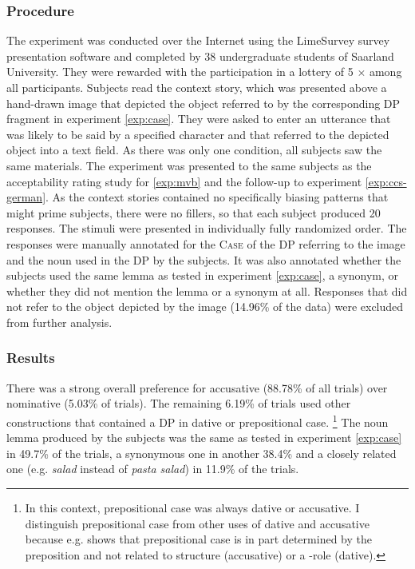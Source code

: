 \subsubsection{Procedure}
The experiment was conducted over the Internet using the LimeSurvey survey presentation software and completed by 38 undergraduate students of Saarland University. They were rewarded with the participation in a lottery of 5 $\times$  among all participants. Subjects read the context story, which was presented above a hand-drawn image that depicted the object referred to by the corresponding DP fragment in experiment \ref{exp:case}. They were asked to enter an utterance that was likely to be said by a specified character and that referred to the depicted object into a text field. As there was only one condition, all subjects saw the same materials. The experiment was presented to the same subjects as the acceptability rating study for \ref{exp:mvb} and the follow-up to experiment \ref{exp:ccs-german}. As the context stories contained no specifically biasing patterns that might prime subjects, there were no fillers, so that each subject produced 20 responses. The stimuli were presented in individually fully randomized order. The responses were manually annotated for the \textsc{Case} of the DP referring to the image and the noun used in the DP by the subjects. It was also annotated whether the subjects used the same lemma as tested in experiment \ref{exp:case}, a synonym, or whether they did not mention the lemma or a synonym at all. Responses that did not refer to the object depicted by the image (14.96\% of the data) were excluded from further analysis.

\subsubsection{Results}
There was a strong overall preference for accusative (88.78\% of all trials) over nominative (5.03\% of trials). The remaining 6.19\% of trials used other constructions that contained a DP in dative or prepositional case.%
%
\footnote{In this context, prepositional case was always dative or accusative. I distinguish prepositional case from other uses of dative and accusative because e.g. \citet{zwarts2005} shows that prepositional case is in part determined by the preposition and not related to structure (accusative) or a \texttheta-role (dative).}\afterfn%
%
The noun lemma produced by the subjects was the same as tested in experiment \ref{exp:case} in 49.7\% of the trials, a synonymous one in another 38.4\% and a closely related one (e.g. \textit{salad} instead of \textit{pasta salad}) in 11.9\% of the trials.

